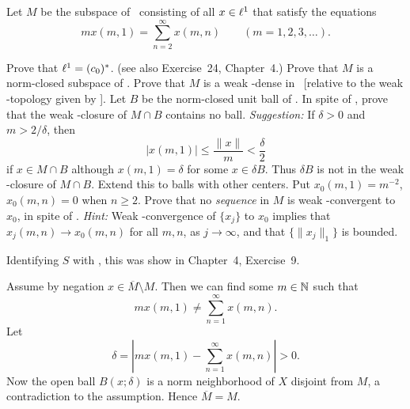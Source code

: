 \begin{enumerate}
\begin{excopy}
Let $M$ be the subspace of \ellone\ consisting of all \(x\in\ell^1\)
that satisfy the equations
\begin{equation*}
mx(m, 1) = \sum_{n=2}^\infty x(m,n) \qquad (m=1,2,3,\ldots).
\end{equation*}
\begin{itemize}
Prove that \(\ell^1 = (c_0)^*\). (see also Exercise~24, Chapter~4.)
Prove that $M$ is a norm-closed subspace of \ellone.
Prove that $M$ is a weak \upstar-dense in \ellone\ [relative to the
weak \upstar-topology given by ].
Let $B$ be the norm-closed unit ball of \ellone. In spite of ,
prove that the weak \upstar-closure of \(M\cap B\) contains no ball.
\emph{Suggestion:} If \(\delta>0\) and \(m > 2/\delta\), then
\begin{equation*}
|x(m,1)| \leq \frac{\|x\|}{m} < \frac{\delta}{2}
\end{equation*}
if \(x\in M \cap B\) although  \(x(m,1) = \delta\) for some \(x\in \delta B\).
Thus \(\delta B\) is not in the weak \upstar-closure of \(M\cap B\).
Extend this to balls with other centers.
Put \(x_0(m,1) = m^{-2}\), \(x_0(m,n)=0\) when \(n\geq 2\).
Prove that no \emph{sequence} in $M$ is weak \upstar-convergent to \(x_0\),
in spite of .
\emph{Hint:} Weak \hbox{\upstar-convergence} of
\(\{x_j\}\) to \(x_0\) implies
that \mbox{\(x_j(m,n)\to x_0(m,n)\)} for all \(m,n\), as \(j\to\infty\),
and that \(\{\|x_j\|_1\}\) is bounded.
\end{itemize}
\end{excopy}
\begin{itemize}

Identifying $S$ with \N, this was show in \cite{RudinRCA87} Chapter~4,
Exercise~9.

Assume by negation \(x \in \overline{M}\setminus M\).
Then we can find some \(m\in\mathbb{N}\) such that
\begin{equation*}
mx(m, 1) \neq \sum_{n=1}^\infty x(m,n).
\end{equation*}
Let
\begin{equation*}
\delta = \left| mx(m, 1) - \sum_{n=1}^\infty x(m,n) \right| > 0.
\end{equation*}
Now the open ball \(B(x;\delta)\) is a norm neighborhood of $X$
disjoint from $M$, a contradiction to the assumption.
Hence \(\overline{M} = M\).


\end{itemize}
\end{enumerate}
